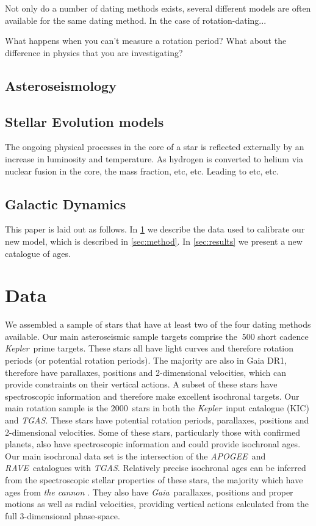 \documentclass[useAMS, usenatbib, preprint, 12pt]{aastex}
\newcommand{\racomment}[1]{{\color{red}#1}}
\newcommand{\Kepler}{{\it Kepler}}
\newcommand{\kepler}{\Kepler}
\newcommand{\TGAS}{{\it TGAS}}
\newcommand{\tgas}{{\it TGAS}}
\newcommand{\apogee}{{\it APOGEE}}
\newcommand{\gaia}{{\it Gaia}}
\newcommand{\rave}{{\it RAVE}}
\newcommand{\nkictgas}{2000}
\begin{document}
Not only do a number of dating methods exists, several different models are
often available for the same dating method.
In the case of rotation-dating...

\racomment{What happens when you can't measure a rotation period?}
\racomment{What about the difference in physics that you are investigating?}

\subsection{Asteroseismology}

\subsection{Stellar Evolution models}
The ongoing physical processes in the core of a star is reflected externally
by an increase in luminosity and temperature.
As hydrogen is converted to helium via nuclear fusion in the core, the mass
fraction, etc, etc.
Leading to etc, etc.


\subsection{Galactic Dynamics}

This paper is laid out as follows.
In \textsection \ref{sec:data} we describe the data used to calibrate our new
model, which is described in \textsection \ref{sec:method}.
In \textsection \ref{sec:results} we present a new catalogue of ages.

\section{Data}
\label{sec:data}
We assembled a sample of stars that have at least two of the four dating
methods available.
Our main asteroseismic sample targets comprise the $~$500 short cadence
\kepler\ prime targets.
These stars all have light curves and therefore rotation periods (or potential
rotation periods).
The majority are also in Gaia DR1, therefore have parallaxes, positions and
2-dimensional velocities, which can provide constraints on their vertical
actions.
A subset of these stars have spectroscopic information and therefore make
excellent isochronal targets.
Our main rotation sample is the \nkictgas\ stars in both the \kepler\ input
catalogue (KIC) and \TGAS.
These stars have potential rotation periods, parallaxes, positions and
2-dimensional velocities.
Some of these stars, particularly those with confirmed planets, also have
spectroscopic information and could provide isochronal ages.
Our main isochronal data set is the intersection of the \apogee\ and \rave\
catalogues with \tgas.
Relatively precise isochronal ages can be inferred from the spectroscopic
stellar properties of these stars, the majority which have ages from {\it the
cannon} \citep{Ness2015, Casey2016}.
They also have \gaia\ parallaxes, positions and proper motions as well as
radial velocities, providing vertical actions calculated from the full
3-dimensional phase-space.
\end{document}

